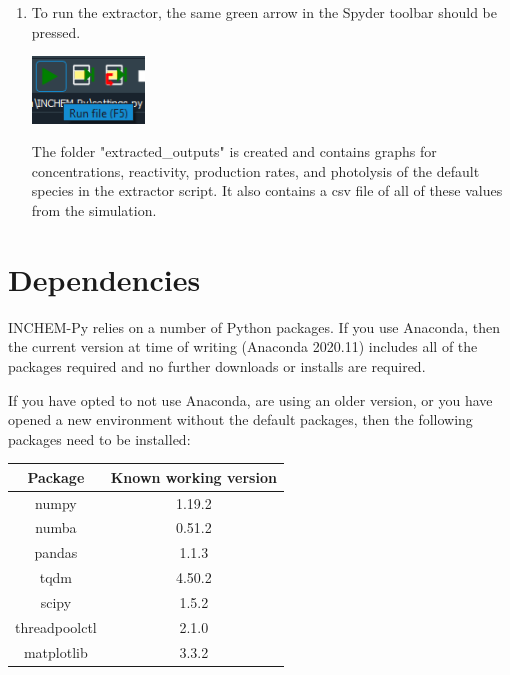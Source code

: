 \documentclass[a4paper]{refart}
\begin{document}
{\begin{minipage}{\fullwidth}
\begin{enumerate}
    \item To run the extractor, the same green arrow in the Spyder toolbar should be pressed.

            \vspace{1em}
            \begin{minipage}[t]{\linewidth}
                \centering
                \includegraphics[width = 3cm]{run.png}
            \end{minipage}

          The folder "extracted\_outputs" is created and contains graphs for concentrations, reactivity, production rates, and photolysis of the default species in the extractor script. It also contains a csv file of all of these values from the simulation.
\end{enumerate}
\end{minipage}}

\newpage
\section{Dependencies}


INCHEM-Py relies on a number of Python packages. If you use Anaconda, then the current version at time of writing (Anaconda 2020.11) includes all of the packages required and no further downloads or installs are required.

If you have opted to not use Anaconda, are using an older version, or you have opened a new environment without the default packages, then the following packages need to be installed:
\begin{table}[h!]
    \centering
    \begin{tabular}{c|c}
        Package & Known working version \\
        \hline
        numpy & 1.19.2 \\
        numba & 0.51.2 \\
        pandas & 1.1.3 \\
        tqdm & 4.50.2 \\
        scipy & 1.5.2 \\
        threadpoolctl & 2.1.0 \\
        matplotlib & 3.3.2 \\
    \end{tabular}
\end{table}
\end{document}
